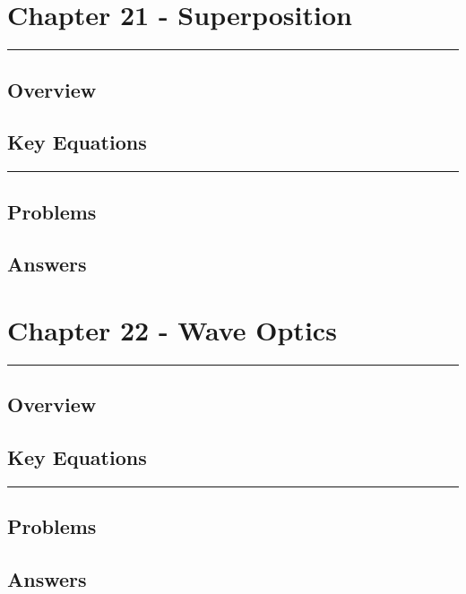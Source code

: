 \documentclass[a4paper,12pt]{article}
\begin{document}
\pagebreak
\section*{Chapter 21 - Superposition}
\rule{\linewidth}{1pt}
\subsection*{Overview}
\subsection*{Key Equations}

\begin{center}
  \rule{6cm}{0.5pt}
\end{center}
\subsection*{Problems}
\subsection*{Answers}

\pagebreak
\section*{Chapter 22 - Wave Optics}
\rule{\linewidth}{1pt}
\subsection*{Overview}
\subsection*{Key Equations}

\begin{center}
  \rule{6cm}{0.5pt}
\end{center}
\subsection*{Problems}
\subsection*{Answers}
\end{document}

